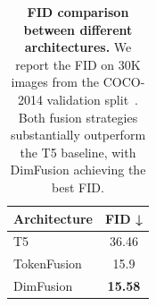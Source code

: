 \begin{table}[t]
\centering
{\setlength{\tabcolsep}{8pt}
\begin{tabular}{lc}
\toprule
\textbf{Architecture} & \textbf{FID} ↓ \\
\midrule
T5 & 36.46 \\
TokenFusion & 15.9 \\
DimFusion & \textbf{15.58}\\
\bottomrule 
\end{tabular}
}
\caption{\textbf{FID comparison between different architectures.} We report the FID on 30K images from the COCO-2014 validation split~\cite{lin2014microsoft}. Both fusion strategies substantially outperform the T5 baseline, with DimFusion achieving the best FID.}
\label{tab:dimfusion-fid-comparison}
\end{table}
